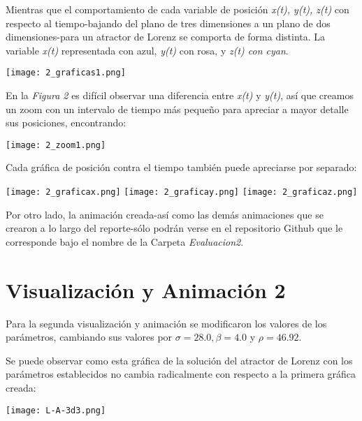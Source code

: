 \documentclass{article}
\begin{document}
Mientras que el comportamiento de cada variable de posición \textit{x(t), y(t), z(t)} con respecto al tiempo-bajando del plano de tres dimensiones a un plano de dos dimensiones-para un atractor de Lorenz se comporta de forma distinta. La variable \textit{x(t)} representada con azul, \textit{y(t)} con rosa, y \textit{z(t) con cyan}.

	\begin{center}
    \texttt{[image: 2\_graficas1.png]}
    \end{center}

En la \textit{Figura 2} es difícil observar una diferencia entre \textit{x(t)} y \textit{y(t)}, así que creamos un zoom con un intervalo de tiempo más pequeño para apreciar a mayor detalle sus posiciones, encontrando:
	
    \begin{center}
    \centering
    \texttt{[image: 2\_zoom1.png]}
    \end{center}

Cada gráfica de posición contra el tiempo también puede apreciarse por separado:

	\begin{center}
    \centering
    \texttt{[image: 2\_graficax.png]}
	\texttt{[image: 2\_graficay.png]}
    \texttt{[image: 2\_graficaz.png]}
    \end{center}

Por otro lado, la animación creada-así como las demás animaciones que se crearon a lo largo del reporte-sólo podrán verse en el repositorio Github que le corresponde bajo el nombre de la Carpeta \textit{Evaluacion2}.




\section{Visualización y Animación 2}

Para la segunda visualización y animación se modificaron los valores de los parámetros, cambiando sus valores por $\sigma=28.0, \beta=4.0$ y $\rho=46.92 $.

Se puede observar como esta gráfica de la solución del atractor de Lorenz con los parámetros establecidos no cambia radicalmente con respecto a la primera gráfica creada:

	\begin{center}
    \texttt{[image: L-A-3d3.png]}
    \end{center}
\end{document}
